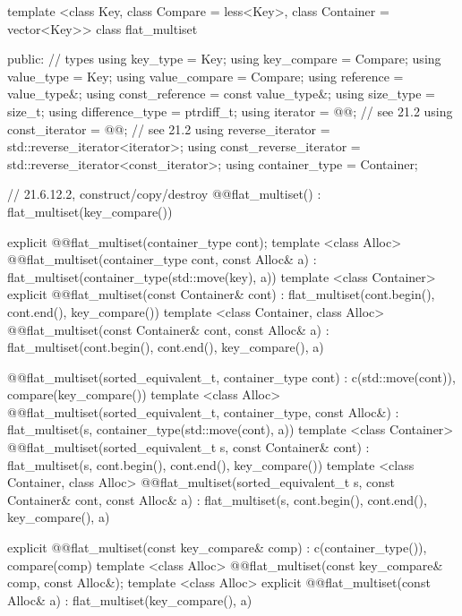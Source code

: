 \begin{codeblock}
template <class Key, class Compare = less<Key>, class Container = vector<Key>>
class flat_multiset {
  public:
    // types
    using key_type                  = Key;
    using key_compare               = Compare;
    using value_type                = Key;
    using value_compare             = Compare;
    using reference                 = value_type&;
    using const_reference           = const value_type&;
    using size_type                 = size_t;
    using difference_type           = ptrdiff_t;
    using iterator                  = @@; // see 21.2
    using const_iterator            = @@; // see 21.2
    using reverse_iterator          = std::reverse_iterator<iterator>;
    using const_reverse_iterator    = std::reverse_iterator<const_iterator>;
    using container_type            = Container;

    // 21.6.12.2, construct/copy/destroy
    @@flat_multiset() : flat_multiset(key_compare()) { }

    explicit @@flat_multiset(container_type cont);
    template <class Alloc>
      @@flat_multiset(container_type cont, const Alloc& a)
        : flat_multiset(container_type(std::move(key), a)) { }
    template <class Container>
      explicit @@flat_multiset(const Container& cont)
        : flat_multiset(cont.begin(), cont.end(), key_compare()) { }
    template <class Container, class Alloc>
      @@flat_multiset(const Container& cont, const Alloc& a)
        : flat_multiset(cont.begin(), cont.end(), key_compare(), a) { }

    @@flat_multiset(sorted_equivalent_t, container_type cont)
      : c(std::move(cont)), compare(key_compare()) { }
    template <class Alloc>
      @@flat_multiset(sorted_equivalent_t, container_type, const Alloc&)
        : flat_multiset(s, container_type(std::move(cont), a)) { }
    template <class Container>
      @@flat_multiset(sorted_equivalent_t s, const Container& cont)
        : flat_multiset(s, cont.begin(), cont.end(), key_compare()) { }
    template <class Container, class Alloc>
      @@flat_multiset(sorted_equivalent_t s, const Container& cont, const Alloc& a)
        : flat_multiset(s, cont.begin(), cont.end(), key_compare(), a) { }

    explicit @@flat_multiset(const key_compare& comp)
      : c(container_type()), compare(comp) { }
    template <class Alloc>
      @@flat_multiset(const key_compare& comp, const Alloc&);
    template <class Alloc>
      explicit @@flat_multiset(const Alloc& a)
        : flat_multiset(key_compare(), a) { }

}
\end{codeblock}
